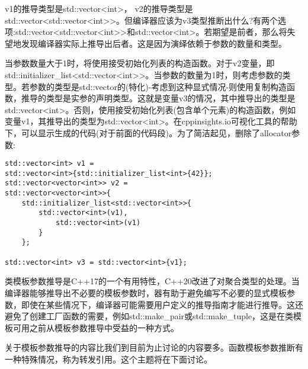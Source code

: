 v1的推导类型是std::vector<int>， v2的推导类型是std::vector<std::vector<int>>。但编译器应该为v3类型推断出什么?有两个选项:std::vector<std::vector<int>>和std::vector<int>。若期望是前者，那么将失望地发现编译器实际上推导出后者。这是因为演绎依赖于参数的数量和类型。

当参数数量大于1时，将使用接受初始化列表的构造函数。对于v2变量，即std::initializer\_list<std::vector<int>>。当参数的数量为1时，则考虑参数的类型。若参数的类型是std::vector的(特化)-考虑到这种显式情况-则使用复制构造函数，推导的类型是实参的声明类型。这就是变量v3的情况，其中推导出的类型是std::vector<int>。否则，使用接受初始化列表(包含单个元素)的构造函数，例如变量v1，其推导出的类型为std::vector<int>。在cppinsights.io可视化工具的帮助下，可以显示生成的代码(对于前面的代码段)。为了简洁起见，删除了allocator参数:

\begin{lstlisting}[style=styleCXX]
std::vector<int> v1 =
std::vector<int>{std::initializer_list<int>{42}};
std::vector<vector<int>> v2 =
std::vector<vector<int>>{
	std::initializer_list<std::vector<int>>{
		std::vector<int>(v1),
			std::vector<int>(v1)
		}
	};

std::vector<int> v3 = std::vector<int>{v1};
\end{lstlisting}

类模板参数推导是C++17的一个有用特性，C++20改进了对聚合类型的处理。当编译器能够推导出不必要的模板参数时，器有助于避免编写不必要的显式模板参数，即使在某些情况下，编译器可能需要用户定义的推导指南才能进行推导。这还避免了创建工厂函数的需要，例如std::make\_pair或std::make\_tuple，这是在类模板可用之前从模板参数推导中受益的一种方式。

关于模板参数推导的内容比我们到目前为止讨论的内容要多。函数模板参数推断有一种特殊情况，称为转发引用。这个主题将在下面讨论。







